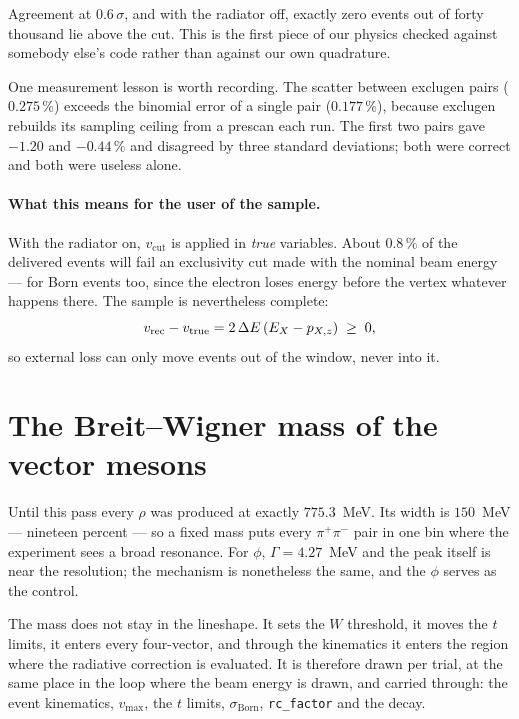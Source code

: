 \documentclass[11pt]{article}
\newcommand{\vcut}{v_{\mathrm{cut}}}
\newcommand{\sborn}{\sigma_{\mathrm{Born}}}
\newcommand{\code}[1]{\texttt{#1}}
\begin{document}
Agreement at $0.6\,\sigma$, and with the radiator off, exactly zero events out
of forty thousand lie above the cut. This is the first piece of our physics
checked against somebody else's code rather than against our own quadrature.

One measurement lesson is worth recording. The scatter between exclugen pairs
($0.275\,\%$) exceeds the binomial error of a single pair ($0.177\,\%$),
because exclugen rebuilds its sampling ceiling from a prescan each run. The
first two pairs gave $-1.20$ and $-0.44\,\%$ and disagreed by three standard
deviations; both were correct and both were useless alone.

\paragraph{What this means for the user of the sample.}
With the radiator on, $\vcut$ is applied in \emph{true} variables. About
$0.8\,\%$ of the delivered events will fail an exclusivity cut made with the
nominal beam energy --- for Born events too, since the electron loses energy
before the vertex whatever happens there. The sample is nevertheless complete:
\begin{equation}
v_{\rm rec}-v_{\rm true}=2\,\Delta E\,(E_X-p_{X,z})\;\ge\;0 ,
\end{equation}
so external loss can only move events out of the window, never into it.

\section{The Breit--Wigner mass of the vector mesons}
\label{sec:bw}

Until this pass every $\rho$ was produced at exactly $775.3$~MeV. Its width is
$150$~MeV --- nineteen percent --- so a fixed mass puts every $\pi^+\pi^-$
pair in one bin where the experiment sees a broad resonance. For $\phi$,
$\Gamma=4.27$~MeV and the peak itself is near the resolution; the mechanism
is nonetheless the same, and the $\phi$ serves as the control.

The mass does not stay in the lineshape. It sets the $W$ threshold, it moves
the $t$ limits, it enters every four-vector, and through the kinematics it
enters the region where the radiative correction is evaluated. It is
therefore drawn per trial, at the same place in the loop where the beam
energy is drawn, and carried through: the event kinematics, $v_{\max}$, the
$t$ limits, $\sborn$, \code{rc\_factor} and the decay.
\end{document}
